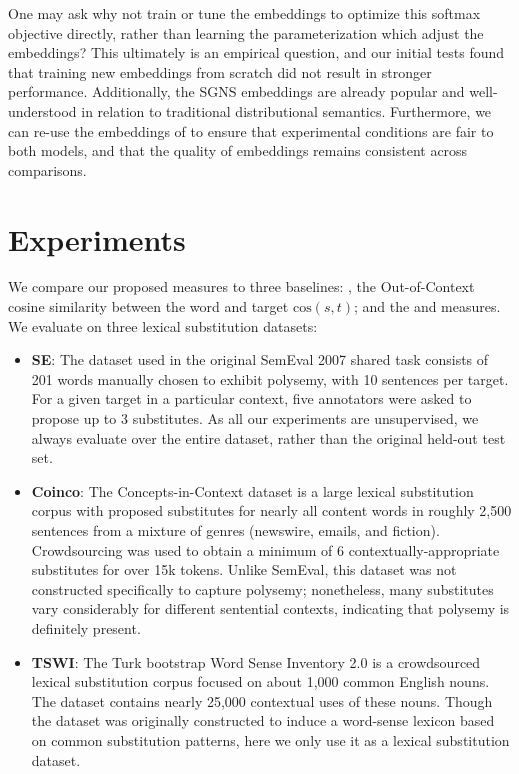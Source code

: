 One may ask why not train or tune the embeddings to optimize this softmax
objective directly, rather than learning the parameterization which adjust the
embeddings? This ultimately is an empirical question, and our initial tests
found that training new embeddings from scratch did not result in stronger
performance. Additionally, the SGNS embeddings are already popular and
well-understood in relation to traditional distributional semantics.
Furthermore, we can re-use the embeddings of  to
ensure that experimental conditions are fair to both models, and that
the quality of embeddings remains consistent across comparisons.


\section{Experiments}
We compare our proposed measures to three baselines: \ooc, the Out-of-Context
cosine similarity between the word and target $\mbox{cos}(s, t)$; and the
\mbox{\addCos} and \mbox{\balAddCos} measures.
We evaluate on three lexical substitution datasets:
\begin{itemize}
\item {\bf SE}: The dataset used in the original SemEval 2007 shared task
\cite{mccarthy:2007:semeval} consists of 201 words manually chosen to exhibit
polysemy, with 10 sentences per target. For a given target in a particular
context, five annotators were asked to propose up to 3 substitutes. As all our
experiments are unsupervised, we always evaluate over the entire dataset,
rather than the original held-out test set.
\item {\bf Coinco}: The Concepts-in-Context dataset \cite{kremer:2014:eacl} is a
large lexical substitution corpus with proposed substitutes for nearly all
content words in roughly 2,500 sentences from a mixture of genres (newswire,
emails, and fiction). Crowdsourcing was used to obtain a minimum of 6
contextually-appropriate substitutes for over 15k tokens. Unlike SemEval, this
dataset was not constructed specifically to capture polysemy; nonetheless,
many substitutes vary considerably for different sentential contexts,
indicating that polysemy is definitely present.
\item {\bf TSWI}: The Turk bootstrap Word Sense Inventory 2.0 \cite{biemann:2012:lrec}
is a crowdsourced lexical substitution corpus focused on about 1,000 common
English nouns. The dataset contains nearly 25,000 contextual uses of these
nouns. Though the dataset was originally constructed to induce a word-sense
lexicon based on common substitution patterns, here we only use it as a
lexical substitution dataset.
\end{itemize}

